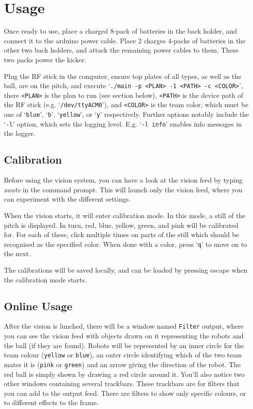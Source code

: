 \documentclass[a4paper,12pt]{scrartcl}
\begin{document}
\section{Usage}

Once ready to use, place a charged 8-pack of batteries in the back holder, and
connect it to the arduino power cable. Place 2 charges 4-packs of batteries in
the other two back holders, and attack the remaining power cables to them.
These two packs power the kicker.

Plug the RF stick in the computer, ensure top plates of all types, as well as
the ball, are on the pitch, and execute
`\texttt{./main -p <PLAN> -1 <PATH> -c <COLOR>}', there \texttt{<PLAN>} is the
plan to run (see section below), \texttt{<PATH>} is the device path of the RF
stick (e.g. `\verb$/dev/ttyACM0$'), and \texttt{<COLOR>} is the team color,
which must be one of `\texttt{blue}', `\texttt{b}', `\texttt{yellow}', or
`\texttt{y}' respectively. Further options notably include the `\texttt{-l}'
option, which sets the logging level. E.g. `\texttt{-l info}' enables info
messages in the logger.

\subsection{Calibration}

Before using the vision system, you can have a look at the vision feed by typing \emph{xawtv} in the command prompt. This will launch only the vision feed, where you can experiment with the different settings.

When the vision starts, it will enter calibration mode. In this mode, a still
of the pitch is displayed. In turn, red, blue, yellow, green, and pink will be
calibrated for. For each of these, click multiple times on parts of the still
which should be recognised as the specified color. When done with a color,
press `\texttt{q}' to move on to the next.

The calibrations will be saved locally, and can be loaded by pressing escape
when the calibration mode starts.

\subsection{Online Usage}

After the vision is lunched, there will be a window named \texttt{Filter} output, where you can see the vision feed with objects drawn on it representing the robots and the ball (if they are found).
Robots will be represented by an inner circle for the team colour (\texttt{yellow} or \texttt{blue}), an outer circle identifying which of the two team mates it is (\texttt{pink} or \texttt{green}) and an arrow giving the direction of the robot. The red ball is simply shown by drawing a red circle around it. You'll also notice two other windows containing several trackbars.
These trackbars are for filters that you can add to the output feed. There are filters to show only specific colours, or to different effects to the frame.
\end{document}

